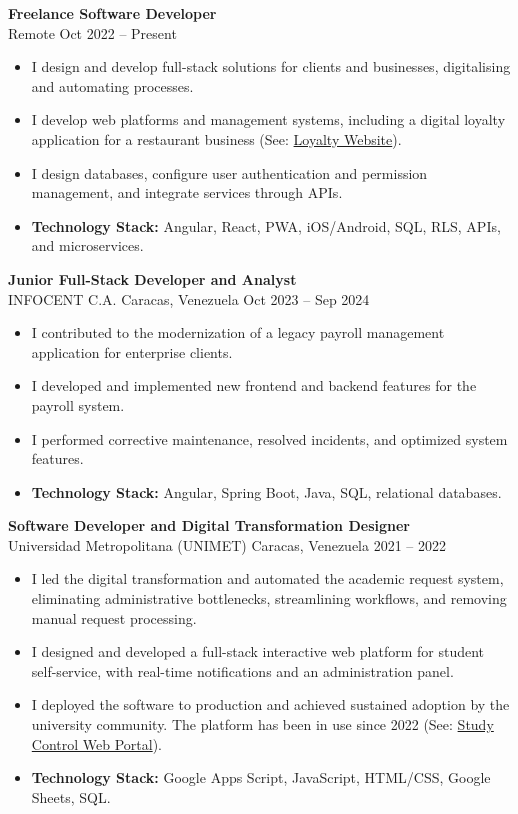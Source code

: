 \documentclass[10pt,a4paper]{article}
\begin{document}
\textbf{\large Freelance Software Developer}\\
{\color{muted}Remote \textbar{} Oct 2022 -- Present}
\begin{itemize}
    \item I design and develop full-stack solutions for clients and businesses, digitalising and automating processes.
    \item I develop web platforms and management systems, including a digital loyalty application for a restaurant business (See: \href{https://avenidakebab.com/}{Loyalty Website}).
    \item I design databases, configure user authentication and permission management, and integrate services through APIs.
    \item \textbf{Technology Stack:} Angular, React, PWA, iOS/Android, SQL, RLS, APIs, and microservices.
\end{itemize}

\textbf{\large Junior Full-Stack Developer and Analyst}\\
{\color{muted}INFOCENT C.A. \textbar{} Caracas, Venezuela \textbar{} Oct 2023 -- Sep 2024}
\begin{itemize}
    \item I contributed to the modernization of a legacy payroll management application for enterprise clients.
    \item I developed and implemented new frontend and backend features for the payroll system.
    \item I performed corrective maintenance, resolved incidents, and optimized system features.
    \item \textbf{Technology Stack:} Angular, Spring Boot, Java, SQL, relational databases.
\end{itemize}

\textbf{\large Software Developer and Digital Transformation Designer}\\
{\color{muted}Universidad Metropolitana (UNIMET) \textbar{} Caracas, Venezuela \textbar{} 2021 -- 2022}
\begin{itemize}
    \item I led the digital transformation and automated the academic request system, eliminating administrative bottlenecks, streamlining workflows, and removing manual request processing.
    \item I designed and developed a full-stack interactive web platform for student self-service, with real-time notifications and an administration panel.
    \item I deployed the software to production and achieved sustained adoption by the university community. The platform has been in use since 2022 (See: \href{https://script.google.com/macros/s/AKfycbw3h26r_mjt0jow79RT9dnPaUKZ81dVUsF8qDeEjp7wsRg-ldqHjlB9L0FJYP_Uc_LXUw/exec}{Study Control Web Portal}).
    \item \textbf{Technology Stack:} Google Apps Script, JavaScript, HTML/CSS, Google Sheets, SQL.
\end{itemize}
\end{document}
